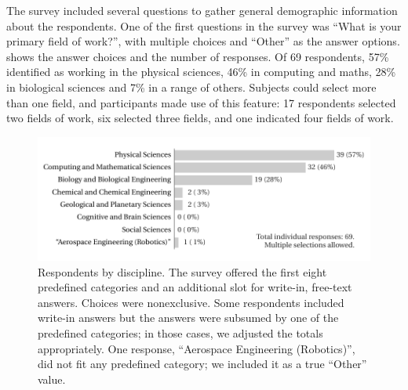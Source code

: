 \documentclass{casicswhitepaper}
\newcommand{\totalRespondents}{69\xspace}
\begin{document}
%
%
%
%
%

The survey included several questions to gather general demographic information about the respondents.  One of the first questions in the survey was ``What is your primary field of work?'', with multiple choices and ``Other'' as the answer options.   shows the answer choices and the number of responses.  Of \totalRespondents respondents, 57\% identified as working in the physical sciences, 46\% in computing and maths, 28\% in biological sciences and 7\% in a range of others.  Subjects could select more than one field, and participants made use of this feature: 17 respondents selected two fields of work, six selected three fields, and one indicated four fields of work.

\begin{figure}[h]
  \vspace*{-1ex}
  \centering
  \includegraphics{files/plots/respondents-by-discipline.pdf}
  \vspace*{-3.5ex}
  \caption{Respondents by discipline.  The survey offered the first eight predefined categories and an additional slot for write-in, free-text answers.  Choices were nonexclusive.  Some respondents included write-in answers but the answers were subsumed by one of the predefined categories; in those cases, we adjusted the totals appropriately.  One response, ``Aerospace Engineering (Robotics)'', did not fit any predefined category; we included it as a true ``Other'' value.}
  \label{disciplines}
\end{figure}
\end{document}
